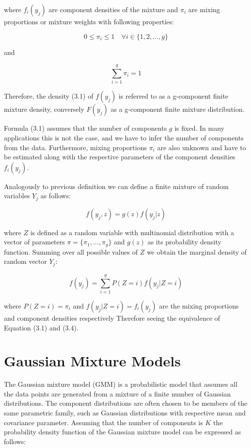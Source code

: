 where $f_i(y_j)$ are component densities of the mixture and $\pi_i$ are mixing proportions or mixture weights with following properties:

\begin{equation}
    0 \leq \pi_i \leq 1 \quad \forall i \in \{1,2,\ldots,g\}
\end{equation}

and

\begin{equation}
    \sum_{i=1}^{g} \pi_i = 1
\end{equation}

Therefore, the density (3.1) of $f(y_j)$ is referred to as a g-component finite mixture density, conversely $F(y_j)$ 
as a g-component finite mixture distribution. 

Formula (3.1) assumes that the number of components $g$ is fixed. In many applications this is not the case, and we have to infer 
the number of components from the data. Furthermore, mixing proportions $\pi_i$ are also unknown and have to be estimated along with 
the respective parameters of the component densities $f_i(y_j)$.

Analogously to previous definition we can define a finite mixture of random variables $Y_j$ as follows:

\begin{equation}
    f(y_j,z) =  g(z) f(y_j|z)
\end{equation}

where $Z$ is defined as a random variable with multinomial distribution with a vector of parameters $\pi = \{\pi_1,\ldots,\pi_g\}$ and $g(z)$ as its probability density function.
Summing over all possible values of $Z$ we obtain the marginal density of random vector $Y_j$:

\begin{equation}
    f(y_j) = \sum_{i=1}^{g} P(Z=i) f(y_j|Z=i)
\end{equation}
    
where $P(Z=i) = \pi_i$ and $f(y_j|Z=i) = f_i(y_j)$ are the mixing proportions and component densities respectively Therefore
seeing the equivalence of Equation (3.1) and (3.4).

\section{Gaussian Mixture Models}
The Gaussian mixture model (GMM) is a probabilistic model that assumes all the data points are generated 
from a mixture of a finite number of Gaussian distributions. The component distributions are often chosen to be members of the same parametric family,
such as Gaussian distributions with respective mean and covariance parameter. Assuming that the number of components is $K$
the probability density function of the Gaussian mixture model can be expressed as follows:

